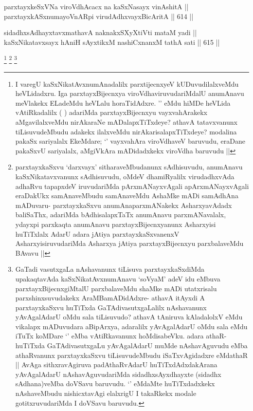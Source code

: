 
\begin{shl}
parxtayxkeSxVNa viroVdhAcacx na kaSxNasayx vinAshitA || \\
parxtayxkASxnumayoVnARpi virudAdhxvayxBicAritA ||  614 ||  
\end{shl}
				
\begin{shl}
sidadhxsAdhayxtavxmathavA naknakxSXyXtiVti mataM yadi || \\
kaSxNikatavxsayx hAniH sAyxtikxM nashiCxnanxM tathA sati ||  615 ||  
\end{shl}

\begin{artha}
\footnote{I varegU kaSxNikatAvxnumAnadalilx parxtijecnxyeV kUDuvudilalxveMdu heVLidadxru. Iga parxtayxBijecnxya viroVdhaviruvudariMdalU anumAnavu meVlakekx ELadeMdu heVLalu horaTidAdxre. '\stext' eMdu hiMDe heVLida vAtiRkadalilx (  ) adariMda parxtayxBijecnxyu vayxvahArakekx aMgavilalxveMdu nirAkaraNe mADalapxTiTxdeye? athavA tatavxvanunx tiLisuvudeMbudu adakekx ilalxveMdu nirAkarisalapxTiTxdeye? modalina pakaSx sariyalalx EkeMdare; `\stext' vayxvahAra viroVdhaveV baruvudu, eraDane pakaSxvU sariyalalx, aMgiVkAra mADidadxkekx viroVdha baruvudu ||}
\footnote{parxtayxkaSxvu `darxvayx' sitharaveMbudanunx sAdhisuvudu, anumAnavu kaSxNikatavxvanunx sAdhisuvudu, oMdeV dhamiRyalilx virudadhxvAda adhaRvu tapapxdeV iruvudariMda pArxmANayxvAgali apArxmANayxvAgali eraDakUkx samAnaveMbudu samAnaveMdu AshaMke mADi samAdhAna mADuvaru- parxtayxkaSxvu anumAnaparxmANakekx AsharxyavAdadx baliSaThx, adariMda bAdhisalapxTaTx anumAnavu parxmANavalalx, ydayxpi parxkaqta anumAnavu parxtayxBijecnxyanunx Asharxyisi huTiTxlalx AdarU adara jAtiya parxtayxkaSxvanenxV AsharxyisiruvudariMda Asharxya jAtiya parxtayxBijecnxyu parxbalaveMdu BAvavu ||}
\footnote{GaTadi vasutxgaLa nAshavanunx tiLisuva parxtayxkaSxdiMda upakaqtavAda kaSxNikatAvxnumAnavu `soV\s yaM' adeV idu eMbuva parxtayxBijecnxgiMtalU parxbalaveMdu shaMke mADi utatxrisalu parxshinxsuvudakekx AraMBamADidAdxre- athavA itAyxdi A parxtayxkaSxvu huTiTxda GaTAdivasutxgaLalilx nAshavanunx yAvAgalAdarU oMdu sala tiLisuvudo? athavA tAniruva kAladalolxV eMdu vikalapx mADuvudara aBipArxya, adaralilx yAvAgalAdarU oMdu sala eMdu iTuTx koMDare `\stext' eMba vAtiRkavanunx hoMdisabeVku. adara athaR- huTiTxda GaTAdivasutxgaLu yAvAgalAdarU muMde nAshavAguvudu eMba athaRvanunx parxtayxkaSxvu tiLisuvudeMbudu iSaTxvAgidadxre eMdathaR || AvAga sithxravAgiruva padAthaRvAdarU huTiTxdAdxdakArana yAvAgalAdarU nAshavAguvudariMda sidadhxsAyxdhayxte (sidadhx sAdhana)veMba doVSavu baruvudu. `\stext' eMdaMte huTiTxdadxkekx nAshaveMbudu nishicxtavAgi elalxrigU I takaRkekx modale gotitxruvudariMda I doVSavu baruvudu.}

\end{artha}
